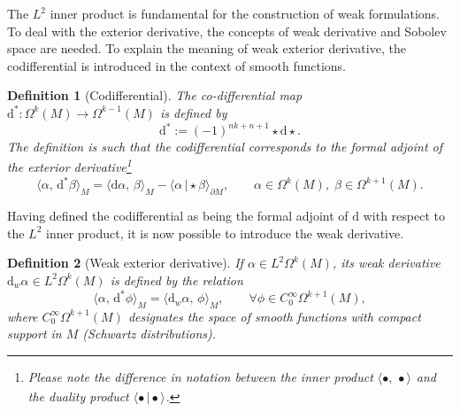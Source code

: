 \documentclass{elsarticle}
\newtheorem{definition}{Definition}
\renewcommand\d{\ensuremath{\mathrm{d}}}
\newcommand{\inpr}[3][]{\ensuremath{\langle #2, \, #3 \rangle_{#1}}}
\newcommand{\dualpr}[3][]{\ensuremath{\langle #2 \, \vert #3 \rangle_{#1}}}
\begin{document}
The $L^2$ inner product is fundamental for the construction of weak formulations. To deal with the exterior derivative, the concepts of weak derivative and Sobolev space are needed. To explain the meaning of weak exterior derivative, the codifferential is introduced in the context of smooth functions.
\begin{definition}[Codifferential]
    The co-differential map $\d^* : \Omega^k(M) \xrightarrow{} \Omega^{k-1}(M)$ is defined by
\begin{equation}\label{eq:codif}
        \d^* := (-1)^{nk + n + 1} {\star} \d {\star}.
\end{equation}
The definition is such that the codifferential corresponds to the formal  adjoint of the exterior derivative\footnote{Please note the difference in notation between the inner product $\inpr{\bullet}{\bullet}$ and the duality product $\dualpr{\bullet}{\bullet}$.}
\begin{equation}\label{eq:intbyparts_codif}
    \inpr[M]{\alpha}{\d^* \beta} = \inpr[M]{\mathrm{d} \alpha}{\beta} - \dualpr[\partial M]{\alpha}{\star \beta}, \qquad \alpha \in \Omega^k(M), \; \beta \in \Omega^{k+1}(M).
\end{equation}
\end{definition}
Having defined the codifferential 
as being the formal adjoint of $\d$ with respect to the $L^2$ inner product, it is now possible to introduce
the weak derivative. 
\begin{definition}[Weak exterior derivative]
If $\alpha \in L^2\Omega^k(M)$, its weak derivative $\d_w \alpha \in L^2\Omega^k(M)$ is defined by the relation
\begin{equation}\label{eq:weak_d}
    \inpr[M]{\alpha}{\d^*\phi} = \inpr[M]{\d_w \alpha}{\phi}, \qquad \forall \phi \in C_0^\infty \Omega^{k+1}(M),
\end{equation}
where $C_0^\infty \Omega^{k+1}(M)$ designates the space of smooth functions with compact support in $M$ (Schwartz distributions).
\end{definition}
\end{document}
